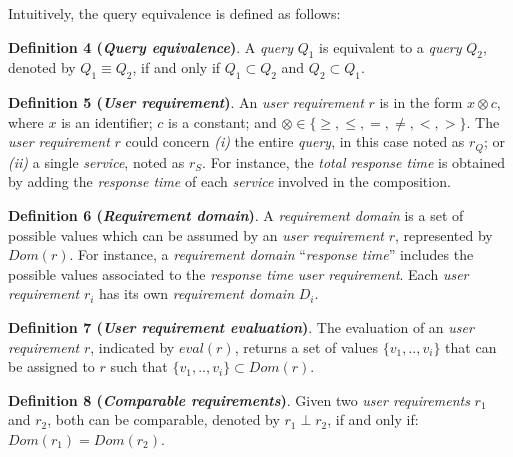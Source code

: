 \bigskip
Intuitively, the query equivalence is defined as follows:

\bigskip
\noindent \textbf{Definition 4 (\textsl{Query equivalence})}.
A \textsl{query} $Q_{1}$ is equivalent to a \textsl{query} $Q_{2}$, denoted by $Q_{1} \equiv Q_{2}$, if and only if $Q_{1} \subset Q_{2}$ and $Q_{2} \subset Q_{1}$.
%

\bigskip
\noindent \textbf{Definition 5 (\textsl{User requirement})}.
An \textsl{user requirement} $r$ is in the form $x \otimes c$, where $x$ is an identifier; $c$ is a constant; and $\otimes \in\lbrace \geq, \leq, =, \neq, <, >\rbrace$. 
%
The \textsl{user requirement} $r$ could concern \textit{(i)} the entire \textsl{query}, in this case noted as $r_{Q}$; or \textit{(ii)} a single \textsl{service}, noted as $r_{S}$. For instance, the \textsl{total response time} is obtained by adding the \textsl{response time} of each \textsl{service} involved in the composition.

\bigskip
\noindent \textbf{Definition 6 (\textsl{Requirement domain})}. A \textsl{requirement domain} is a set of possible values which can be assumed by an \textsl{user requirement} $r$, represented by $Dom(r)$. For instance, a \textsl{requirement domain} ``\textit{response time}'' includes the possible values associated to the \textit{response time} \textsl{user requirement}. Each \textsl{user requirement} $r_{i}$ has its own \textsl{requirement domain} $D_{i}$. 

\bigskip
\noindent \textbf{Definition 7 (\textsl{User requirement evaluation})}. The evaluation of an \textsl{user requirement} $r$, indicated by $eval(r)$, returns a set of values $\lbrace v_{1},..,v_{i} \rbrace$ that can be assigned to $r$ such that $\lbrace v_{1},..,v_{i} \rbrace \subset Dom(r)$.

\bigskip
\noindent \textbf{Definition 8 (\textsl{Comparable requirements})}. Given two \textsl{user requirements} $r_{1}$ and $r_{2}$, both can be comparable, denoted by $r_{1} \perp r_{2}$, if and only if:  $Dom(r_{1}) = Dom(r_{2})$.


